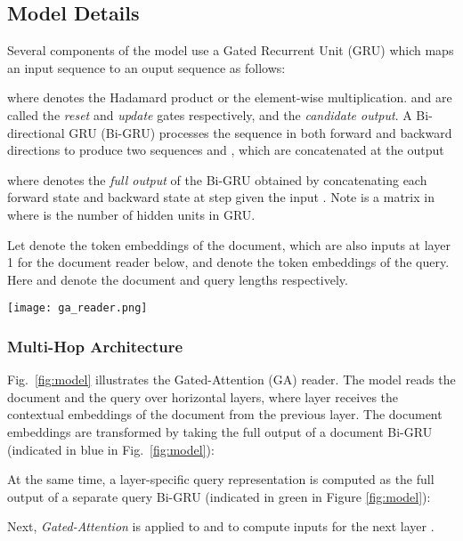 \documentclass[11pt,a4paper]{article}
\begin{document}
\subsection{Model Details}
\label{sec:model-details}
Several components of the model use a Gated Recurrent Unit (GRU) \citep{cho2014learning} which maps an input sequence  to an ouput sequence  as follows:

where  denotes the Hadamard product or the element-wise multiplication.
 and  are called the \textit{reset} and \textit{update} gates respectively, and  the \textit{candidate output}. 
A Bi-directional GRU (Bi-GRU) processes the sequence in both forward and backward directions to produce two sequences  and , which are concatenated at the output

where  denotes the \textit{full output} of the Bi-GRU obtained by concatenating each forward state  and backward state  at step  given the input . Note  is a matrix in  where  is the number of hidden units in GRU.

Let  denote the token embeddings of the document, which are also inputs at layer 1 for the document reader below, and  denote the token embeddings of the query. Here  and  denote the document and query lengths respectively.



\begin{figure*}[t]
\centering
\caption{Gated-Attention Reader. Dashed lines represent dropout connections.}
\texttt{[image: ga\_reader.png]}
\label{fig:model}
\end{figure*}

\subsubsection{Multi-Hop Architecture}
Fig.\ \ref{fig:model} illustrates the Gated-Attention (GA) reader. 
The model reads the document and the query over  horizontal layers,
where layer  receives the contextual embeddings  of the document from the previous layer. The document embeddings are transformed by taking the full output of a document Bi-GRU (indicated in blue in Fig.\ \ref{fig:model}):

At the same time, a layer-specific query representation is computed as the full output of a separate query Bi-GRU (indicated in green in Figure \ref{fig:model}):


Next, \textit{Gated-Attention} is applied to  and  to compute inputs for the next layer .
\end{document}
